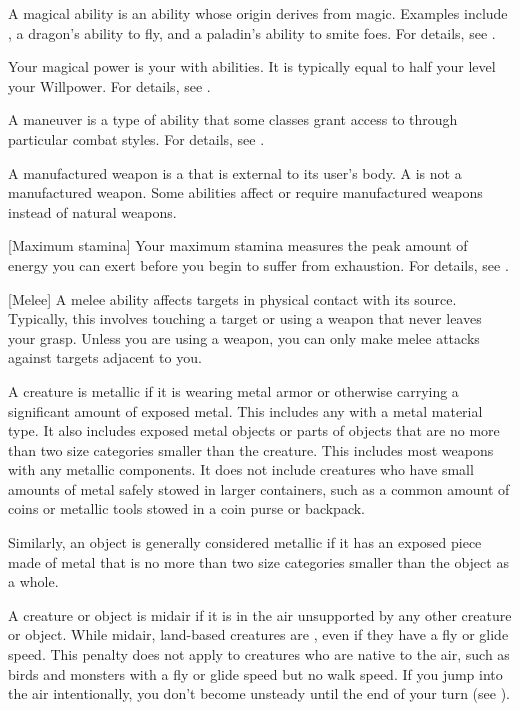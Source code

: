  A magical ability is an ability whose origin derives from magic.
Examples include , a dragon's ability to fly, and a paladin's ability to smite foes.
For details, see .

 Your magical power is your  with \magical abilities.
It is typically equal to half your level \add your Willpower.
For details, see .

 A maneuver is a type of  ability that some classes grant access to through particular combat styles.
For details, see .

 A manufactured weapon is a  that is external to its user's body.
A  is not a manufactured weapon.
Some abilities affect or require manufactured weapons instead of natural weapons.

[Maximum stamina] Your maximum stamina measures the peak amount of energy you can exert before you begin to suffer from exhaustion.
For details, see .

[Melee] A melee ability affects targets in physical contact with its source.
Typically, this involves touching a target or using a weapon that never leaves your grasp.
Unless you are using a  weapon, you can only make melee attacks against targets adjacent to you.

 A creature is metallic if it is wearing metal armor or otherwise carrying a significant amount of exposed metal.
This includes any  with a metal material type.
It also includes exposed metal objects or parts of objects that are no more than two size categories smaller than the creature.
This includes most weapons with any metallic components.
It does not include creatures who have small amounts of metal safely stowed in larger containers, such as a common amount of coins or metallic tools stowed in a coin purse or backpack.

Similarly, an object is generally considered metallic if it has an exposed piece made of metal that is no more than two size categories smaller than the object as a whole.

 A creature or object is midair if it is in the air unsupported by any other creature or object.
While midair, land-based creatures are \unsteady, even if they have a fly or glide speed.
This penalty does not apply to creatures who are native to the air, such as birds and monsters with a fly or glide speed but no walk speed.
If you jump into the air intentionally, you don't become unsteady until the end of your turn (see ).

